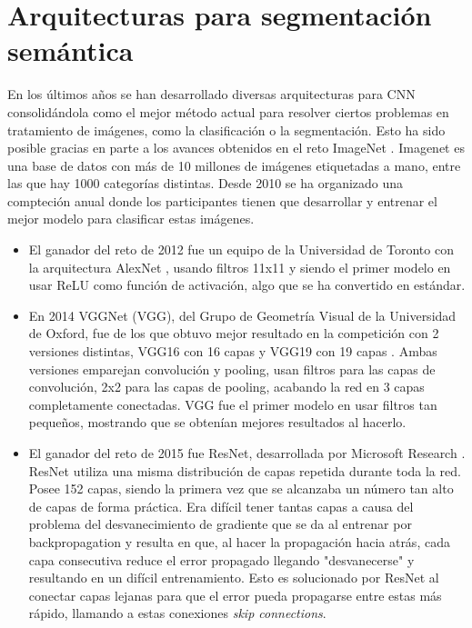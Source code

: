 \chapter{Arquitecturas para segmentación semántica}\label{sec:archs}

En los últimos años se han desarrollado diversas arquitecturas para CNN consolidándola como el mejor método actual para resolver ciertos problemas en tratamiento de imágenes, como la clasificación o la segmentación. Esto ha sido posible gracias en parte a los avances obtenidos en el reto ImageNet \cite{Deng2009}. 
Imagenet es una base de datos con más de 10 millones de imágenes etiquetadas a mano, entre las que hay 1000 categorías distintas. Desde 2010 se ha organizado una compteción anual donde los participantes tienen que desarrollar y entrenar el mejor modelo para clasificar estas imágenes. 
\begin{itemize}
\item El ganador del reto de 2012 fue un equipo de la Universidad de Toronto con la arquitectura AlexNet \cite{Krizhevsky2012}, usando filtros 11x11 y siendo el primer modelo en usar ReLU como función de activación, algo que se ha convertido en estándar.
\item En 2014 VGGNet (VGG), del Grupo de Geometría Visual de la Universidad de Oxford, fue de los que obtuvo mejor resultado en la competición con 2 versiones distintas, VGG16 con 16 capas y VGG19 con 19 capas \cite{Simonyan2014}. Ambas versiones emparejan convolución y pooling, usan filtros para las capas de convolución, 2x2 para las capas de pooling, acabando la red en 3 capas completamente conectadas. VGG fue el primer modelo en usar filtros tan pequeños, mostrando que se obtenían mejores resultados al hacerlo.
\item El ganador del reto de 2015 fue ResNet, desarrollada por Microsoft Research \cite{He2015}. ResNet utiliza una misma distribución de capas repetida durante toda la red. Posee 152 capas, siendo la primera vez que se alcanzaba un número tan alto de capas de forma práctica. Era difícil tener tantas capas a causa del problema del desvanecimiento de gradiente \cite{Hochreiter1998} que se da al entrenar por backpropagation y resulta en que, al hacer la propagación hacia atrás, cada capa consecutiva reduce el error propagado llegando "desvanecerse" y resultando en un difícil entrenamiento. Esto es solucionado por ResNet al conectar capas lejanas para que el error pueda propagarse entre estas más rápido, llamando a estas conexiones \textit{skip connections}.
\end{itemize}

